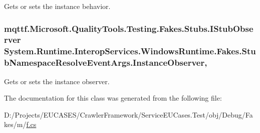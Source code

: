 Gets or sets the instance behavior.

\hypertarget{class_system_1_1_runtime_1_1_interop_services_1_1_windows_runtime_1_1_fakes_1_1_stub_namespace_resolve_event_args_ae0d103c8bf4bde838c34f8cd7d290c71}{
\subsubsection[{Instance\-Observer}]{\setlength{\rightskip}{0pt plus 5cm}mqttf.\-Microsoft.\-Quality\-Tools.\-Testing.\-Fakes.\-Stubs.\-I\-Stub\-Observer System.\-Runtime.\-Interop\-Services.\-Windows\-Runtime.\-Fakes.\-Stub\-Namespace\-Resolve\-Event\-Args.\-Instance\-Observer\hspace{0.3cm}{\ttfamily [get]}, {\ttfamily [set]}}}\label{class_system_1_1_runtime_1_1_interop_services_1_1_windows_runtime_1_1_fakes_1_1_stub_namespace_resolve_event_args_ae0d103c8bf4bde838c34f8cd7d290c71}


Gets or sets the instance observer.



The documentation for this class was generated from the following file\-:\begin{DoxyCompactItemize}
\item 
D\-:/\-Projects/\-E\-U\-C\-A\-S\-E\-S/\-Crawler\-Framework/\-Service\-E\-U\-Cases.\-Test/obj/\-Debug/\-Fakes/m/\hyperlink{m_2f_8cs}{f.\-cs}\end{DoxyCompactItemize}
